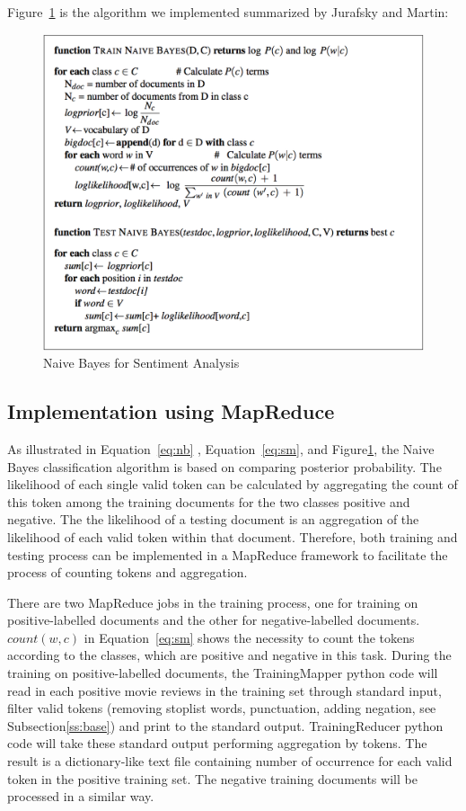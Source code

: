 Figure~\ref{f:algo} is the algorithm we implemented summarized by Jurafsky 
and Martin:
\begin{figure}[!ht]
		\centering\includegraphics[width=\columnwidth]{images/algorithm.png}
		\caption{Naive Bayes for Sentiment 
		Analysis~\cite{hid-sp18-405-sentiment-jurafsky2009}}\label{f:algo}
\end{figure}

\subsection{Implementation using MapReduce}

As illustrated in Equation~\ref{eq:nb} , Equation~\ref{eq:sm}, and 
Figure\ref{f:algo}, the Naive Bayes classification algorithm is based on 
comparing posterior probability. The likelihood of each single valid token can 
be calculated by aggregating the count of this token among the training 
documents for the two classes positive and negative. The the likelihood of a 
testing document is an aggregation of the likelihood of each valid token 
within that document. Therefore, both training and testing process can be 
implemented in a MapReduce framework to facilitate the process of counting 
tokens and aggregation. 

There are two MapReduce jobs in the training process, one for training on 
positive-labelled documents and the other for negative-labelled documents. 
$count(w,c)$ in Equation~\ref{eq:sm} shows the necessity to count the 
tokens according to the classes, which are positive and negative in this task. 
During the training on positive-labelled documents, the TrainingMapper 
python code will read in each positive movie reviews in the training set 
through standard input, filter valid tokens (removing stoplist words, 
punctuation, adding negation, see Subsection\ref{ss:base}) and print to the 
standard output. TrainingReducer python code will take these standard 
output performing aggregation by tokens. The result is a dictionary-like text 
file containing number of occurrence for each valid token in the positive 
training set. The negative training documents will be processed in a similar 
way. 

